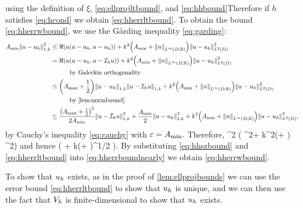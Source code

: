   using the definition of $\xi$, \eqref{eq:ellprojltbound}, and \eqref{eq:hhbound}Therefore if $h$ satisfies \eqref{eq:hcond} we obtain \eqref{eq:hherrltbound}.
To obtain the bound \eqref{eq:hherrwbound}, we use the G\r{a}rding inequality \eqref{eq:garding}:
\begin{align*}
  \Amin \NW{u-\uh}^2 &\leq \Re\mleft(a\mleft(u-\uh,u-\uh\mright)\mright) + k^2\mleft(\Amin+ \NLiDRR{n}\mright) \NLtD{u-\uh}^2\\
                     &= \Re\mleft(a\mleft(u-\uh,u-\Ih u\mright)\mright) + k^2\mleft(\Amin+ \NLiDRR{n}\mright) \NLtD{u-\uh}^2\\
  &\quad\quad\quad\text{by Galerkin orthogonality}\\
                     &\leq \mleft(\Amax+\half\mright) \NW{u-\uh}\NW{u-\Ih u} + k^2\mleft(\Amin+ \NLiDRR{n}\mright) \NLtD{u-\uh}^2\\
  &\quad\quad\quad\text{by \cref{lem:normbound}}\\
  &\leq \frac{\mleft(\Amax+\half\mright)^2}{2\Amin} \NW{u-\Ih u}^2 + \frac{\Amin}2 \NW{u-\uh}^2 + k^2\mleft(\Amin+ \NLiDRR{n}\mright) \NLtD{u-\uh}^2,\\
\end{align*}
by Cauchy's inequality \eqref{eq:cauchy} with $\varepsilon = A_{\min}.$ Therefore,
\beqs
{}^2 \leq {} \mleft( ^2+ k^2\mleft(\Amin+ \mright) ^2\mright)
\eeqs
and hence
\beq\label{eq:hherrboundnearly}
 \lesssim {} \mleft( + k\mleft(\Amin+ \mright)^{1/2} \mright).
\eeq
By substituting \eqref{eq:hhszbound} and \eqref{eq:hherrltbound} into \eqref{eq:hherrboundnearly} we obtain \eqref{eq:hherrwbound}.

To show that $u_{h}$ exists, as in the proof of \cref{lem:ellprojbounds} we can use the error bound \eqref{eq:hherrltbound} to show that $u_{h}$ is unique, and we can then use the fact that $V_{h}$ is finite-dimensional to show that $u_{h}$ exists.
\epf








